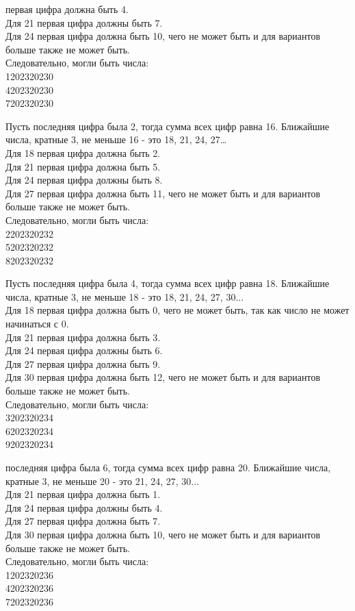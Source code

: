  первая цифра должна быть 4.\\
Для 21 первая цифра должны быть 7.\\
Для 24 первая цифра должна быть 10, чего не может быть и для вариантов больше также не может быть.\\
Следовательно, могли быть числа:\\
1202320230\\
4202320230\\
7202320230

Пусть последняя цифра была 2, тогда сумма всех цифр равна 16. Ближайшие числа, кратные 3, не меньше 16 - это 18, 21, 24, 27…\\
Для 18 первая цифра должна быть 2.\\
Для 21 первая цифра должна быть 5.\\
Для 24 первая цифра должны быть 8.\\
Для 27 первая цифра должна быть 11, чего не может быть и для вариантов больше также не может быть.\\
Следовательно, могли быть числа:\\
2202320232\\
5202320232\\
8202320232 

Пусть последняя цифра была 4, тогда сумма всех цифр равна 18. Ближайшие числа, кратные 3, не меньше 18 - это 18, 21, 24, 27, 30...\\
Для 18 первая цифра должна быть 0, чего не может быть, так как число не может начинаться с 0.\\
Для 21 первая цифра должна быть 3.\\
Для 24 первая цифра должны быть 6.\\
Для 27 первая цифра должна быть 9.\\
Для 30 первая цифра должна быть 12, чего не может быть и для вариантов больше также не может быть.\\
Следовательно, могли быть числа:\\
3202320234\\
6202320234\\
9202320234\\

\newpage

\hspace{3mm}

 последняя цифра была 6, тогда сумма всех цифр равна 20. Ближайшие числа, кратные 3, не меньше 20 - это 21, 24, 27, 30...\\
Для 21 первая цифра должна быть 1.\\
Для 24 первая цифра должны быть 4.\\
Для 27 первая цифра должна быть 7.\\
Для 30 первая цифра должна быть 10, чего не может быть и для вариантов больше также не может быть.\\
Следовательно, могли быть числа:\\
1202320236\\
4202320236\\
7202320236 

